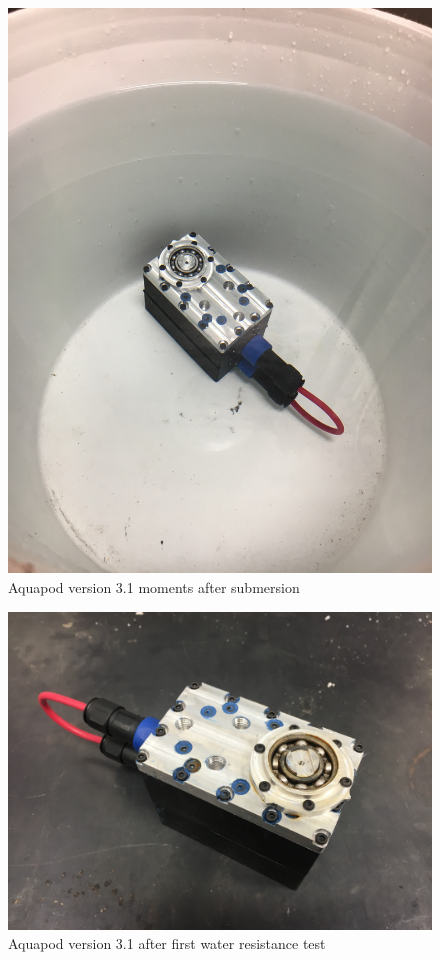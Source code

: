 
\begin{figure}[h]
\centering
\includegraphics[width=1.0\columnwidth]{./img/aquaPod-test-one-start.JPG}
\caption{Aquapod version 3.1 moments after submersion}
\label{fig:pod in bucket}
\end{figure}

\begin{figure}[h]
\centering
\includegraphics[width=1.0\columnwidth]{./img/aquaPod-test-one-rust.JPG}
\caption{Aquapod version 3.1 after first water resistance test}
\label{fig:pod rust}
\end{figure}


